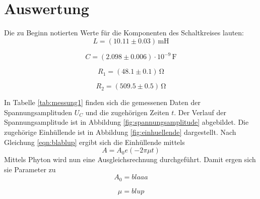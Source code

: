 \section{Auswertung}
\label{sec:Auswertung}
Die zu Beginn notierten Werte für die Komponenten des Schaltkreises lauten:
\begin{equation*}
	L=(10.11 \pm 0.03) \,\si{\milli\henry}
\end{equation*}

\begin{equation*}
	C=(2.098 \pm 0.006) \cdot 10^{-9} \, \si{\farad}
\end{equation*}

\begin{equation*}
	R_\text{1}= (48.1 \pm 0.1) \, \si{\ohm}
\end{equation*}

\begin{equation*}
	R_\text{2}= (509.5\pm 0.5)\,\si{\ohm}
\end{equation*}


In Tabelle \ref{tab:messung1} finden sich die gemessenen Daten der Spannungsamplituden $U_C$ und die zugehörigen Zeiten $t$.
Der Verlauf der Spannungsamplitude ist in Abbildung \ref{fig:spannungsamplitude} abgebildet. Die zugehörige Einhüllende ist in Abbildung \ref{fig:einhuellende} dargestellt.
Nach Gleichung \eqref{eqn:blablup} ergibt sich die Einhüllende mittels
\begin{equation}
	A=A_\text{0}e(-2 \pi \mu t)
\end{equation}
Mittels Phyton wird nun eine Ausgleichsrechnung durchgeführt. Damit ergen sich sie Parameter zu
\begin{equation*}
	A_\text{0}=blaaa
\end{equation*}

\begin{equation*}
	\mu = blup
\end{equation*}
